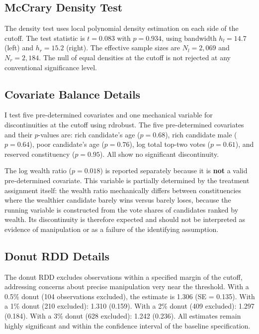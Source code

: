 \documentclass[12pt]{article}
\begin{document}
\subsection{McCrary Density Test}

The \citet{cattaneo2020simple} density test uses local polynomial density estimation on each side of the cutoff. The test statistic is $t = 0.083$ with $p = 0.934$, using bandwidth $h_l = 14.7$ (left) and $h_r = 15.2$ (right). The effective sample sizes are $N_l = 2{,}069$ and $N_r = 2{,}184$. The null of equal densities at the cutoff is not rejected at any conventional significance level.

\subsection{Covariate Balance Details}
\label{sec:balance_appendix}

I test five pre-determined covariates and one mechanical variable for discontinuities at the cutoff using rdrobust. The five pre-determined covariates and their $p$-values are: rich candidate's age ($p = 0.68$), rich candidate male ($p = 0.64$), poor candidate's age ($p = 0.76$), log total top-two votes ($p = 0.61$), and reserved constituency ($p = 0.95$). All show no significant discontinuity.

The log wealth ratio ($p = 0.018$) is reported separately because it is \textbf{not} a valid pre-determined covariate. This variable is partially determined by the treatment assignment itself: the wealth ratio mechanically differs between constituencies where the wealthier candidate barely wins versus barely loses, because the running variable is constructed from the vote shares of candidates ranked by wealth. Its discontinuity is therefore expected and should not be interpreted as evidence of manipulation or as a failure of the identifying assumption.

\subsection{Donut RDD Details}

The donut RDD excludes observations within a specified margin of the cutoff, addressing concerns about precise manipulation very near the threshold. With a 0.5\% donut (104 observations excluded), the estimate is 1.306 (SE = 0.135). With a 1\% donut (210 excluded): 1.310 (0.159). With a 2\% donut (409 excluded): 1.297 (0.184). With a 3\% donut (628 excluded): 1.242 (0.236). All estimates remain highly significant and within the confidence interval of the baseline specification.
\end{document}
